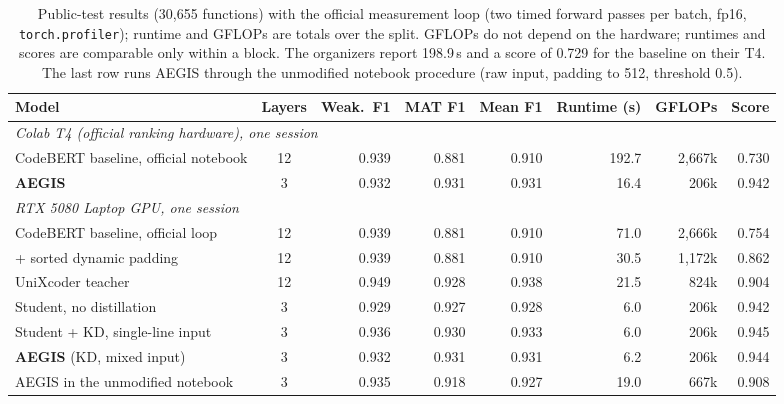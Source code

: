 \begin{table}[t]
\centering
\caption{Public-test results (30{,}655 functions) with the official measurement loop (two timed forward passes per batch, fp16, \texttt{torch.profiler}); runtime and GFLOPs are totals over the split. GFLOPs do not depend on the hardware; runtimes and scores are comparable only within a block. The organizers report 198.9\,s and a score of 0.729 for the baseline on their T4. The last row runs AEGIS through the unmodified notebook procedure (raw input, padding to 512, threshold 0.5).}
\label{tab:main}
\begin{tabular}{lcrrrrrr}
\toprule
Model & Layers & Weak.\ F1 & MAT F1 & Mean F1 & Runtime (s) & GFLOPs & Score \\
\midrule
\multicolumn{8}{l}{\emph{Colab T4 (official ranking hardware), one session}} \\
CodeBERT baseline, official notebook & 12 & 0.939 & 0.881 & 0.910 & 192.7 & 2{,}667k & 0.730 \\
\textbf{AEGIS} & 3 & 0.932 & 0.931 & 0.931 & 16.4 & 206k & 0.942 \\
\midrule
\multicolumn{8}{l}{\emph{RTX 5080 Laptop GPU, one session}} \\
CodeBERT baseline, official loop & 12 & 0.939 & 0.881 & 0.910 & 71.0 & 2{,}666k & 0.754 \\
\quad + sorted dynamic padding & 12 & 0.939 & 0.881 & 0.910 & 30.5 & 1{,}172k & 0.862 \\
UniXcoder teacher & 12 & 0.949 & 0.928 & 0.938 & 21.5 & 824k & 0.904 \\
Student, no distillation & 3 & 0.929 & 0.927 & 0.928 & 6.0 & 206k & 0.942 \\
Student + KD, single-line input & 3 & 0.936 & 0.930 & 0.933 & 6.0 & 206k & 0.945 \\
\textbf{AEGIS} (KD, mixed input) & 3 & 0.932 & 0.931 & 0.931 & 6.2 & 206k & 0.944 \\
\quad AEGIS in the unmodified notebook & 3 & 0.935 & 0.918 & 0.927 & 19.0 & 667k & 0.908 \\
\bottomrule
\end{tabular}
\end{table}
